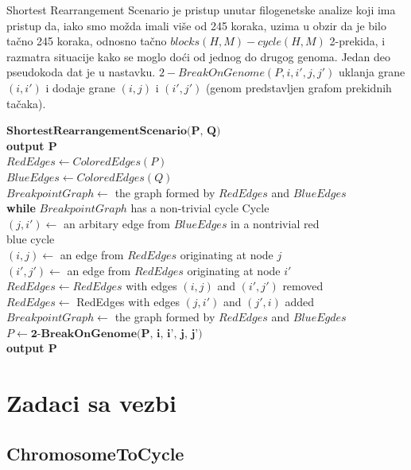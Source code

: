 Shortest Rearrangement Scenario je pristup unutar filogenetske analize koji ima pristup da, iako smo možda imali više od 245 koraka, uzima u obzir da je bilo tačno 245 koraka, odnosno tačno $blocks(H, M) - cycle(H, M)$ 2-prekida, i razmatra situacije kako se moglo doći od jednog do drugog genoma. Jedan deo pseudokoda dat je u nastavku.  $2-BreakOnGenome(P, i, i', j, j')$ uklanja grane $(i, i')$ i dodaje grane $(i, j)$ i $(i', j')$ (genom predstavljen grafom prekidnih tačaka).

\noindent $\textbf{ShortestRearrangementScenario(P, Q)}$\\
\indent \textbf{output P}\\
\indent $RedEdges \leftarrow ColoredEdges(P)$\\
\indent $BlueEdges \leftarrow ColoredEdges(Q)$\\
\indent $BreakpointGraph \leftarrow$ the graph formed by $RedEdges$ and $BlueEdges$\\
\indent \textbf{while} \hspace{0.2cm} $BreakpointGraph$ has a non-trivial cycle Cycle\\
\indent \indent $(j, i') \leftarrow$ an arbitary edge from $BlueEdges$ in a nontrivial red \\
\indent \indent blue cycle\\
\indent \indent $(i, j) \leftarrow$ an edge from $RedEdges$ originating  at node $j$\\
\indent \indent $(i', j') \leftarrow$ an edge from $RedEdges$ originating at node $i'$\\
\indent \indent $RedEdges \leftarrow RedEdges$ with edges $(i, j)$ and $(i', j')$ removed\\
\indent \indent $RedEdges \leftarrow$ RedEdges with edges $(j, i')$ and $(j', i)$ added\\
\indent \indent $BreakpointGraph \leftarrow$ the graph formed by $RedEdges$ and $BlueEgdes$\\
\indent \indent $P \leftarrow \textbf{2-BreakOnGenome(P, i, i', j, j')}$\\
\indent \indent \textbf{output P}\\

\iffalse 


\section{Zadaci sa vezbi}

\setexamplecodestyle
\subsection{ChromosomeToCycle}



